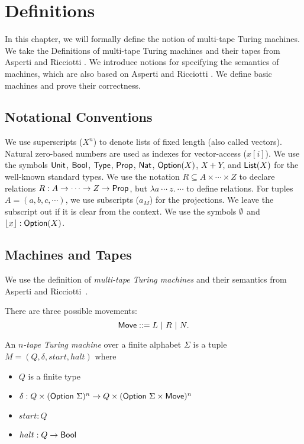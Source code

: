 \chapter{Definitions}
\label{chap:definitions}

In this chapter, we will formally define the notion of multi-tape Turing machines.  We take the Definitions of multi-tape Turing machines and their
tapes from Asperti and Ricciotti \cite{asperti2015}.  We introduce notions for specifying the semantics of machines, which are also based on Asperti
and Ricciotti \cite{asperti2015}.  We define basic machines and prove their correctness.


\section{Notational Conventions}
\label{sec:notational-conventions}

We use superscripts ($X^n$) to denote lists of fixed length (also called vectors).  Natural zero-based numbers are used as indexes for vector-access
($x[i]$).  We use the symbols $\textsf{Unit}$, $\textsf{Bool}$, $\textsf{Type}$, $\textsf{Prop}$, $\textsf{Nat}$, $\textsf{Option}(X)$, $X+Y$, and $\textsf{List}(X)$ for the well-known standard types.  We
use the notation $R \subseteq A \times \cdots \times Z$ to declare relations $R : A \rightarrow \cdots \rightarrow Z \rightarrow \textsf{Prop}$, but $\lambda a~\cdots~z.~\cdots$
to define relations.  For tuples $A = (a, b, c, \cdots)$, we use subscripts ($a_M$) for the projections.  We leave the subscript out if it is clear
from the context.  We use the symbols $\emptyset$ and $\left\lfloor {x}\right\rfloor : \textsf{Option}(X)$.



\section{Machines and Tapes}
\label{sec:machine-tapes}

We use the definition of \emph{multi-tape Turing machines} and their semantics from Asperti and Ricciotti~\cite{asperti2015}.

\begin{definition}[Movement]
  \label{def:movement}
  There are three possible movements:
  $$\textsf{Move} ::= L ~|~ R ~|~ N.$$
\end{definition}


\begin{definition}
  \label{def:mTM}
  An \emph{$n$-tape Turing machine} over a finite alphabet $\Sigma$ is a tuple $M = (Q, \delta, start, halt)$ where
  \begin{itemize}
  \item $Q$ is a finite type
  \item $\delta : Q \times (\textsf{Option}~\Sigma)^n \rightarrow Q \times (\textsf{Option}~\Sigma \times \textsf{Move})^n$
  \item $start:Q$
  \item $halt : Q \rightarrow \textsf{Bool}$ 
  \end{itemize}
\end{definition}

